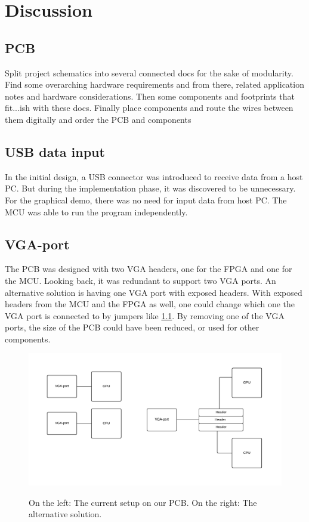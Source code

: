 \documentclass[../main/report.tex]{subfiles}
\begin{document}
\chapter{Discussion}



\section{PCB}
Split project schematics into several connected docs for the sake of modularity. Find some overarching hardware requirements and from there, related application notes and hardware considerations. Then some components and footprints that fit...ish with these docs.
Finally place components and route the wires between them digitally and order the PCB and components




\section{USB data input}
In the initial design, a USB connector was introduced to receive data from a host PC. 
But during the implementation phase, it was discovered to be unnecessary.
For the graphical demo, there was no need for input data from host PC. 
The MCU was able to run the program independently.


\section{VGA-port}
The PCB was designed with two VGA headers, one for the FPGA and one for the MCU. 
Looking back, it was redundant to support two VGA ports.
An alternative solution is having one VGA port with exposed headers.
With exposed headers from the MCU and the FPGA as well, one could change which one the VGA port is connected to by jumpers like \ref{fig:vga-solution}.
By removing one of the VGA ports, the size of the PCB could have been reduced, or used for other components. 


\begin{figure}[H]
    \centering
    \includegraphics[width=\textwidth]{../discussion/assets/vga-solution.pdf}
    \label{fig:vga-solution}
    \caption{On the left: The current setup on our PCB. On the right: The alternative solution.}
\end{figure}
\end{document}
